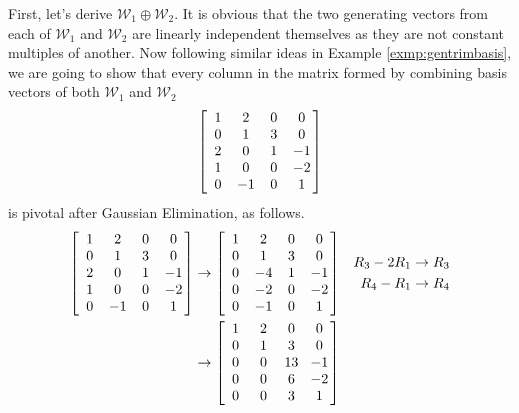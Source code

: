 \begin{solution}
First, let's derive $\mathcal{W}_1 \oplus \mathcal{W}_2$. It is obvious that the two generating vectors from each of $\mathcal{W}_1$ and $\mathcal{W}_2$ are linearly independent themselves as they are not constant multiples of another. Now following  similar ideas in Example \ref{exmp:gentrimbasis}, we are going to show that every column in the matrix formed by combining basis vectors of both $\mathcal{W}_1$ and $\mathcal{W}_2$
\begin{align*}
\left[\begin{array}{@{\;}wc{10pt}wc{10pt}wc{10pt}wc{10pt}@{\;}}
1 & 2 & 0 & 0\\
0 & 1 & 3 & 0\\
2 & 0 & 1 & -1\\
1 & 0 & 0 & -2\\
0 & -1 & 0 & 1
\end{array}\right]    
\end{align*}
is pivotal after Gaussian Elimination, as follows.
\begin{align*}
\left[\begin{array}{@{\;}wc{10pt}wc{10pt}wc{10pt}wc{10pt}@{\;}}
1 & 2 & 0 & 0\\
0 & 1 & 3 & 0\\
2 & 0 & 1 & -1\\
1 & 0 & 0 & -2\\
0 & -1 & 0 & 1
\end{array}\right]  
&\rightarrow
\left[\begin{array}{@{\;}wc{10pt}wc{10pt}wc{10pt}wc{10pt}@{\;}}
1 & 2 & 0 & 0\\
0 & 1 & 3 & 0\\
0 & -4 & 1 & -1\\
0 & -2 & 0 & -2\\
0 & -1 & 0 & 1
\end{array}\right] 
&
\begin{aligned}
R_3 - 2R_1 &\to R_3 \\
R_4 - R_1 &\to R_4
\end{aligned} \\
&\rightarrow
\left[\begin{array}{@{\;}wc{10pt}wc{10pt}wc{10pt}wc{10pt}@{\;}}
1 & 2 & 0 & 0\\
0 & 1 & 3 & 0\\
0 & 0 & 13 & -1\\
0 & 0 & 6 & -2\\
0 & 0 & 3 & 1
\end{array}\right] 
&
\begin{aligned}

\end{aligned}
\end{align*}
\end{solution}
